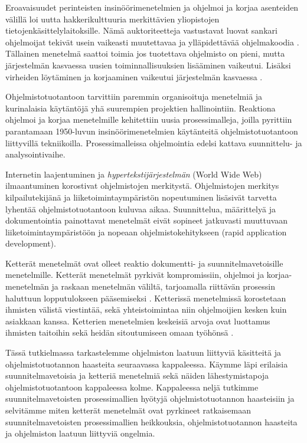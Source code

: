\documentclass[finnish]{tktltiki2}
\theoremstyle{definition}
\theoremstyle{remark}
\begin{document}
Eroavaisuudet perinteisten insinöörimenetelmien ja ohjelmoi ja korjaa asenteiden välillä loi uutta hakkerikulttuuria merkittävien yliopistojen tietojenkäsittelylaitoksille. Nämä auktoriteetteja vastustavat luovat sankari ohjelmoijat tekivät usein vaikeasti muutettavaa ja ylläpidettävää ohjelmakoodia \cite{BOE06}. Tällainen menetelmä saattoi toimia jos tuotettava ohjelmisto on pieni, mutta järjestelmän kasvaessa uusien toiminnallisuuksien lisääminen vaikeutui. Lisäksi virheiden löytäminen ja korjaaminen vaikeutui järjestelmän kasvaessa \cite{FOW01a}.

Ohjelmistotuotantoon tarvittiin paremmin organisoituja menetelmiä ja kurinalaisia käytäntöjä yhä suurempien projektien hallinointiin. Reaktiona ohjelmoi ja korjaa menetelmille kehitettiin uusia prosessimalleja, joilla pyrittiin parantamaan 1950-luvun insinöörimenetelmien käytänteitä ohjelmistotuotantoon liittyvillä tekniikoilla. Prosessimalleissa ohjelmointia edelsi kattava suunnittelu- ja analysointivaihe\cite{BOE06}.

Internetin laajentuminen ja \textit{hypertekstijärjestelmän} (World Wide Web) ilmaantuminen korostivat ohjelmistojen merkitystä. Ohjelmistojen merkitys kilpailutekijänä ja liiketoimintaympäristön nopeutuminen lisäsivät tarvetta lyhentää ohjelmistotuotantoon kuluvaa aikaa. Suunnittelua, määrittelyä ja dokumentointia painottavat menetelmät eivät sopineet jatkuvasti muuttuvaan liiketoimintaympäristöön ja nopeaan ohjelmistokehitykseen (rapid application development)\cite{BOE06}.  

Ketterät menetelmät ovat olleet reaktio dokumentti- ja suunnitelmavetoisille menetelmille. Ketterät menetelmät pyrkivät kompromissiin, ohjelmoi ja korjaa-menetelmän ja raskaan menetelmän väliltä, tarjoamalla riittävän prosessin haluttuun lopputulokseen pääsemiseksi \cite{FOW01a}. Ketterissä menetelmissä korostetaan ihmisten välistä viestintää, sekä yhteistoimintaa niin ohjelmoijien kesken kuin asiakkaan kanssa. Ketterien menetelmien keskeisiä arvoja ovat luottamus ihmisten taitoihin sekä heidän sitoutumiseen omaan työhönsä \cite{COH01}.

Tässä tutkielmassa tarkastelemme ohjelmiston laatuun liittyviä käsitteitä ja ohjelmistotuotannon haasteita seuraavassa kappaleessa. Käymme läpi erilaisia suunnitelmavetoisia ja ketteriä menetelmiä sekä näiden lähestymistapoja ohjelmistotuotantoon kappaleessa kolme. Kappaleessa neljä tutkimme suunnitelmavetoisten prosessimallien hyötyjä ohjelmistotuotannon haasteisiin ja selvitämme miten ketterät menetelmät ovat pyrkineet ratkaisemaan suunnitelmavetoisten prosessimallien heikkouksia, ohjelmistotuotannon haasteita ja ohjelmiston laatuun liittyviä ongelmia. 
\end{document}
